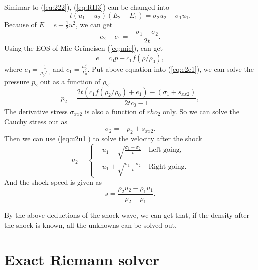 \documentclass[review]{elsarticle}
\begin{document}
Simimar to (\ref{eq:222}), (\ref{eq:RH3}) can be changed into
\begin{equation}
  t(u_1-u_2)(E_2-E_1) =\sigma_2 u_2-\sigma_1u_1.
\end{equation}
Because of $E= e+\frac{1}{2}u^2$, we can get
\begin{equation}\label{eq:e2e1}
  e_2 - e_1 = - \frac{\sigma_1 +\sigma_2}{2t}.
\end{equation}
Using the EOS of Mie-Gr\"uneisen (\ref{eq:mie}), can get
\begin{equation}
  e = c_0p -c_1f(\rho/\rho_0),
\end{equation}
where $c_0 = \frac{1}{\rho_0\Gamma_0}$ and $c_1 = \frac{a_0^2}{\Gamma_0}$.
Put above equation into (\ref{eq:e2e1}), we can solve the pressure $p_2$ out as a function of $\rho_2$. 
\begin{equation}\label{eq:shockp}
  p_2= \frac{2t(c_1f(\rho_2/\rho_0)+e_1)-(\sigma_1+s_{xx2})}{2tc_0-1},
\end{equation}
The derivative stress $\sigma_{xx2}$ is also a function of $rho_2$ only. So we can solve the Cauchy stress out as
\begin{equation}
  \sigma_2 = -p_2 +s_{xx2}.
\end{equation}
Then we can use (\ref{eq:u2u1}) to solve the velocity after the shock
\begin{equation}\label{eq:shocku}
  u_2 = \left\{ \begin{aligned}
	 & u_1 - \sqrt{\frac{\sigma_1- \sigma_2}{t}} \quad \text{Left-going}, \\
	 & u_1 + \sqrt{\frac{\sigma_1- \sigma_2}{t}} \quad \text{Right-going}.
	\end{aligned}
	\right.
  \end{equation}
And the shock speed is given as 
\begin{equation}
  s = \frac{\rho_2u_2-\rho_1u_1}{\rho_2-\rho_1}.
\end{equation}

By the above deductions of the shock wave, we can get that, if the density after the shock is known, all the unknowns can be solved out.

\section{Exact Riemann solver}\label{sec:riemann}

\end{document}
